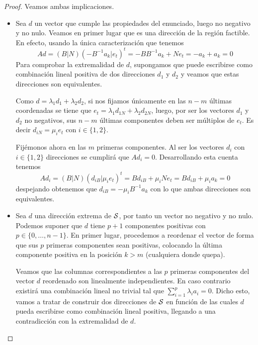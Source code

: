 \begin{proof}Veamos ambas implicaciones.
	\begin{itemize}
		\item[\bla] Sea $d$ un vector que cumple las propiedades del enunciado, luego no negativo y no nulo. Veamos en primer lugar que es una dirección de la región factible. En efecto, usando la única caracterización que tenemos
		\begin{equation*}
			Ad=(B|N)(-B^{-1}a_k|e_t)^t=-BB^{-1}a_k+Ne_t=-a_k+a_k=0
		\end{equation*}
		Para comprobar la extremalidad de $d$, supongamos que puede escribirse como combinación lineal positiva de dos direcciones $d_1$ y $d_2$ y veamos que estas direcciones son equivalentes.
		
		Como $d=\lambda_1 d_1+\lambda_2 d_2$, si nos fijamos únicamente en las $n-m$ últimas coordenadas se tiene que $e_t=\lambda_1d_{1N}+\lambda_2d_{2N}$, luego, por ser los vectores $d_1$ y $d_2$ no negativos, sus $n-m$ últimas componentes deben ser múltiplos de $e_t$. Es decir $d_{iN}=\mu_ie_t$ con $i\in\{1,2\}$.
		
		Fijémonos ahora en las $m$ primeras componentes. Al ser los vectores $d_i$ con $i\in\{1,2\}$ direcciones se cumplirá que $Ad_i=0$. Desarrollando esta cuenta tenemos
		\begin{equation*}
			Ad_i=(B|N)(d_{iB}|\mu_i e_t)^t=Bd_{iB}+\mu_iNe_t=Bd_{iB}+\mu_ia_k=0
		\end{equation*}
		despejando obtenemos que $d_{iB}=-\mu_iB^{-1}a_k$ con lo que ambas direcciones son equivalentes.
		\item[\bra] Sea $d$ una dirección extrema de $\mathcal{S}$, por tanto un vector no negativo y no nulo. Podemos suponer que $d$ tiene $p+1$ componentes positivas con $p\in\{0,\dots,n-1\}$. En primer lugar, procedemos a reordenar el vector de forma que sus $p$ primeras componentes sean positivas, colocando la última componente positiva en la posición $k>m$ (cualquiera donde quepa).
		
		Veamos que las columnas correspondientes a las $p$ primeras componentes del vector $d$ reordenado son linealmente independientes. En caso contrario existirá una combinación lineal no trivial tal que $\sum_{i=1}^{p}\lambda_ia_i=0$. Dicho esto, vamos a tratar de construir dos direcciones de $\mathcal{S}$ en función de las cuales $d$ pueda escribirse como combinación lineal positiva, llegando a una contradicción con la extremalidad de $d$.
		

\end{itemize}
\end{proof}
